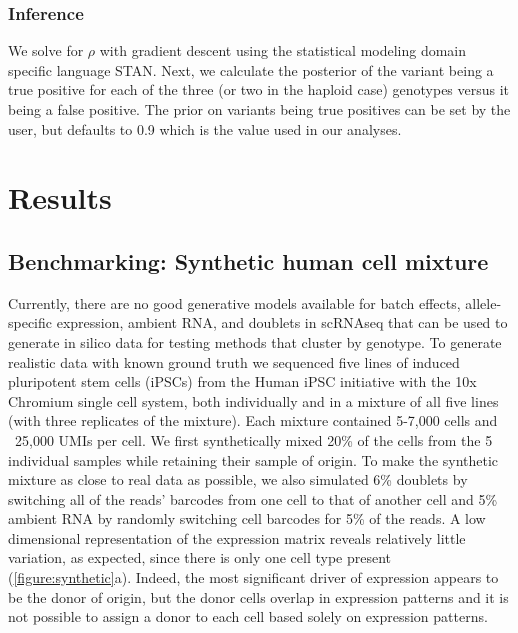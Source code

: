 \subsubsection{Inference}
We solve for $\rho$ with gradient descent using the statistical modeling domain specific language STAN. Next, we calculate the posterior of the variant being a true positive for each of the three (or two in the haploid case) genotypes versus it being a false positive. The prior on variants being true positives can be set by the user, but defaults to 0.9 which is the value used in our analyses.




\section{Results}



\subsection{Benchmarking: Synthetic human cell mixture}

Currently, there are no good generative models available for batch effects, allele-specific expression, ambient RNA, and doublets in scRNAseq that can be used to generate in silico data for testing methods that cluster by genotype. To generate realistic data with known ground truth we sequenced five lines of induced pluripotent stem cells (iPSCs) from the Human iPSC initiative\cite{hipsci} with the 10x Chromium single cell system, both individually and in a mixture of all five lines (with three replicates of the mixture). Each mixture contained 5-7,000 cells and ~25,000 UMIs per cell. We first synthetically mixed 20\% of the cells from the 5 individual samples while retaining their sample of origin. To make the synthetic mixture as close to real data as possible, we also simulated 6\% doublets by switching all of the reads' barcodes from one cell to that of another cell and 5\% ambient RNA by randomly switching cell barcodes for 5\% of the reads. A low dimensional representation of the expression matrix reveals relatively little variation, as expected, since there is only one cell type present (\ref{figure:synthetic}a). Indeed, the most significant driver of expression appears to be the donor of origin, but the donor cells overlap in expression patterns and it is not possible to assign a donor to each cell based solely on expression patterns.



